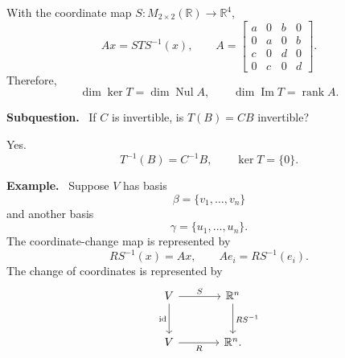 \documentclass[letterpaper]{article}
\newcommand{\noteheader}[1]{\par\medskip\noindent\textbf{#1}\ }
\begin{document}
With the coordinate map $S:M_{2\times2}(\mathbb{R})\to\mathbb{R}^4$,
\[
Ax=STS^{-1}(x),
\qquad
A=\begin{bmatrix}
a&0&b&0\\
0&a&0&b\\
c&0&d&0\\
0&c&0&d
\end{bmatrix}.
\]
Therefore,
\[
\dim\ker T=\dim\operatorname{Nul}A,
\qquad
\dim\operatorname{Im}T=\operatorname{rank}A.
\]

\clearpage

\noteheader{Subquestion.} If $C$ is invertible, is $T(B)=CB$ invertible?

\medskip

Yes.
\[
T^{-1}(B)=C^{-1}B,
\qquad
\ker T=\{0\}.
\]

\bigskip

\noteheader{Example.} Suppose $V$ has basis
\[
\beta=\{v_1,\ldots,v_n\}
\]
and another basis
\[
\gamma=\{u_1,\ldots,u_n\}.
\]
The coordinate-change map is represented by
\[
RS^{-1}(x)=Ax,
\qquad Ae_i=RS^{-1}(e_i).
\]
The change of coordinates is represented by
\[
\begin{tikzcd}[column sep=large,row sep=large]
V \arrow[r,"S"] \arrow[d,"\mathrm{id}"'] & \mathbb{R}^n \arrow[d,"RS^{-1}"] \\
V \arrow[r,"R"'] & \mathbb{R}^n .
\end{tikzcd}
\]

\clearpage
\end{document}
